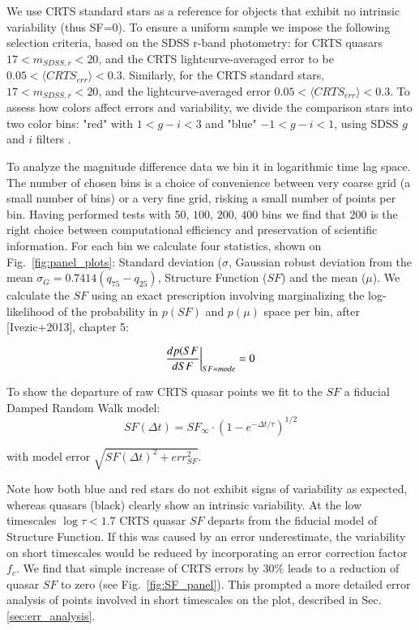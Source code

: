 \documentclass[a4paper,fleqn,usenatbib]{mnras}
\begin{document}
We use CRTS standard stars as a reference for objects that exhibit no intrinsic variability (thus SF=0).  To ensure a uniform sample we impose the following selection criteria, based on the SDSS r-band photometry: for CRTS quasars  $17< m_{SDSS,r} < 20$, and the CRTS lightcurve-averaged error to be  $0.05 < \langle CRTS_{err} \rangle < 0.3$. Similarly, for the CRTS standard stars, $17 < m_{SDSS,r} < 20 $, and the lightcurve-averaged error $0.05 < \langle CRTS_{err} \rangle < 0.3$. To assess how colors affect errors and variability,  we divide the comparison stars into two color bins: "red" with   $1 < g-i < 3$ and "blue" $-1 < g-i < 1$,  using SDSS $g$ and $i$ filters . 

To analyze the magnitude difference data we bin it in logarithmic time lag space. The number of chosen bins is a choice of convenience between very coarse grid (a small number of bins) or a very fine grid, risking a small number of points per bin. Having performed tests  with $50$, $100$, $200$, $400$ bins we find that $200$ is the right choice between computational efficiency and preservation of scientific information. For each bin we calculate four statistics, shown on Fig.~\ref{fig:panel_plots}: Standard deviation ($\sigma$, Gaussian robust deviation from the mean $\sigma_{G}=0.7414 (q_{75}-q_{25})$, Structure Function ($SF$) and the mean ($\mu$).  We calculate the $SF$ using an exact prescription involving marginalizing the log-likelihood of the probability in $p(SF)$ and $p(\mu)$ space per bin, after [Ivezic+2013], chapter 5: 
 
\begin{equation}
\centering
\frac{d p(SF}{d SF } \bigg| _{SF = mode} = 0
\end{equation}

To show the departure of raw CRTS quasar points we fit to the $SF$ a  fiducial Damped Random Walk model:
\begin{equation}
SF(\Delta t) = SF_{\infty} \cdot \left( 1-e^{-\Delta t / \tau} \right) ^ {1/2}
\end{equation}

with model error $\sqrt{SF(\Delta t) ^ {2} + err_{SF} ^ {2}}$. 

Note how both blue and red stars do not exhibit signs of variability as expected, whereas quasars (black) clearly show an intrinsic variability. At the low timescales $\log{\tau} < 1.7$ CRTS quasar $SF$ departs from the fiducial model of Structure Function. 
If this was caused by an error underestimate, the variability on short timescales would be reduced by incorporating an error correction factor $f_{c}$. We find that simple increase of CRTS errors by $30\%$ leads to a reduction of quasar $SF$  to zero (see Fig.~\ref{fig:SF_panel}). This prompted a more detailed error analysis of points involved in short timescales on the plot, described in Sec.\ref{sec:err_analysis}. 
 
\end{document}
